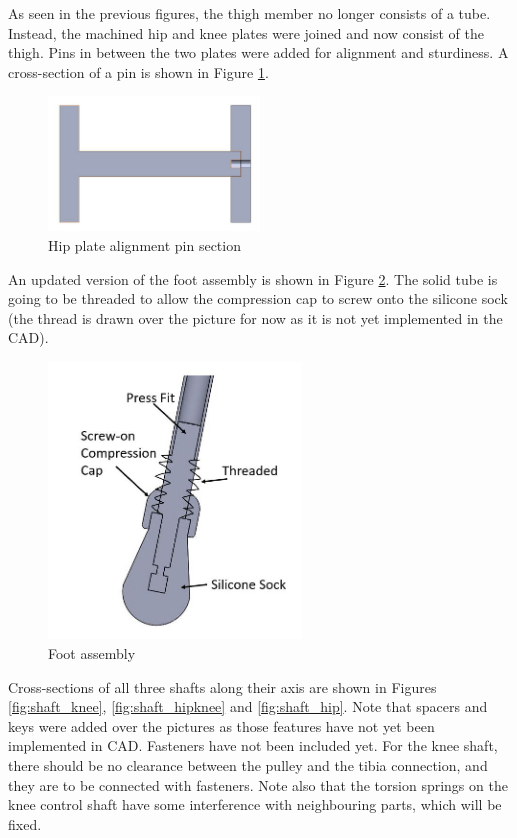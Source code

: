 As seen in the previous figures, the thigh member no longer consists of a tube. Instead, the machined hip and knee plates were joined and now consist of the thigh. Pins in between the two plates were added for alignment and sturdiness. A cross-section of a pin is shown in Figure \ref{fig:hip_alignment}.

\begin{figure}
    \centering
    \includegraphics[width=0.5\textwidth]{2_DetailedDesign/img/HipPlateAlignment.JPG}
    \caption{Hip plate alignment pin section}
    \label{fig:hip_alignment}
\end{figure}

An updated version of the foot assembly is shown in Figure \ref{fig:foot}. The solid tube is going to be threaded to allow the compression cap to screw onto the silicone sock (the thread is drawn over the picture for now as it is not yet implemented in the CAD).

\begin{figure}
    \centering
    \includegraphics[width=0.6\textwidth]{2_DetailedDesign/img/Foot_a.JPG}
    \caption{Foot assembly}
    \label{fig:foot}
\end{figure}

Cross-sections of all three shafts along their axis are shown in Figures \ref{fig:shaft_knee}, \ref{fig:shaft_hipknee} and \ref{fig:shaft_hip}. Note that spacers and keys were added over the pictures as those features have not yet been implemented in CAD. Fasteners have not been included yet. For the knee shaft, there should be no clearance between the pulley and the tibia connection, and they are to be connected with fasteners. Note also that the torsion springs on the knee control shaft have some interference with neighbouring parts, which will be fixed.

